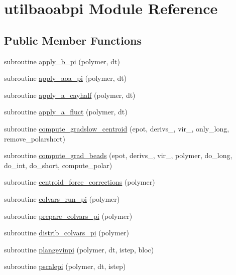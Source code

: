 \hypertarget{classutilbaoabpi}{\section{utilbaoabpi Module Reference}
\label{classutilbaoabpi}
}
\subsection*{Public Member Functions}
\begin{DoxyCompactItemize}
\item 
subroutine \hyperlink{classutilbaoabpi_ace686c3ddc4f4b073ac6dc55a5ea8383}{apply\-\_\-b\-\_\-pi} (polymer, dt)
\item 
subroutine \hyperlink{classutilbaoabpi_a4d075e6d26d3a08b49958c8db2bb3c71}{apply\-\_\-aoa\-\_\-pi} (polymer, dt)
\item 
subroutine \hyperlink{classutilbaoabpi_a71915f5453c7ad7db3deda6b5f77ed18}{apply\-\_\-a\-\_\-cayhalf} (polymer, dt)
\item 
subroutine \hyperlink{classutilbaoabpi_ad601ff511430837292a9a3eb3e121aa7}{apply\-\_\-a\-\_\-fluct} (polymer, dt)
\item 
subroutine \hyperlink{classutilbaoabpi_aa0e6732f79e06a0a1c70795a3a748b70}{compute\-\_\-gradslow\-\_\-centroid} (epot, derivs\-\_\-, vir\-\_\-, only\-\_\-long, remove\-\_\-polarshort)
\item 
subroutine \hyperlink{classutilbaoabpi_a38104b3d22cd8ea3f7510b8a678b1bb6}{compute\-\_\-grad\-\_\-beads} (epot, derivs\-\_\-, vir\-\_\-, polymer, do\-\_\-long, do\-\_\-int, do\-\_\-short, compute\-\_\-polar)
\item 
subroutine \hyperlink{classutilbaoabpi_a5f8850d944b008537872cb2f777f207a}{centroid\-\_\-force\-\_\-corrections} (polymer)
\item 
subroutine \hyperlink{classutilbaoabpi_a9e785f8d8522eb29bf90a658729fbf1e}{colvars\-\_\-run\-\_\-pi} (polymer)
\item 
subroutine \hyperlink{classutilbaoabpi_a4407ec4cbd0f80a26c05e6d96b888e20}{prepare\-\_\-colvars\-\_\-pi} (polymer)
\item 
subroutine \hyperlink{classutilbaoabpi_a499bdce266930ac702dc09e25521901c}{distrib\-\_\-colvars\-\_\-pi} (polymer)
\item 
subroutine \hyperlink{classutilbaoabpi_a6413bbe678f95995e6f2ff62da6fab27}{plangevinpi} (polymer, dt, istep, bloc)
\item 
subroutine \hyperlink{classutilbaoabpi_a5856b428adb9701f3e105adf702160a3}{pscalepi} (polymer, dt, istep)
\end{DoxyCompactItemize}
